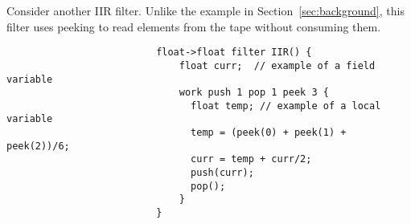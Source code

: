 
Consider another IIR filter.  Unlike the example in
Section~\ref{sec:background}, this filter uses peeking to read
elements from the tape without consuming them.
\begin{singlespace}
\enlargethispage{\baselineskip}
\vspace{-16pt}
\scriptsize
\begin{verbatim}
                          float->float filter IIR() {
                              float curr;  // example of a field variable
                              work push 1 pop 1 peek 3 {
                                float temp; // example of a local variable
                                temp = (peek(0) + peek(1) + peek(2))/6;
                                curr = temp + curr/2;
                                push(curr);
                                pop();
                              }
                          }                         
\end{verbatim}
\end{singlespace}
\vspace{-16pt}


